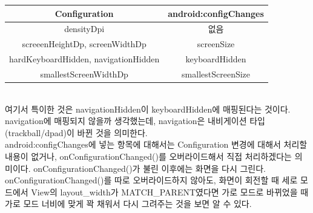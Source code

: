 \begin{tabular}{|c|c|}\hline
Configuration & android:configChanges \\ \hline
densityDpi & 없음 \\ \hline
screeenHeightDp, screenWidthDp & screenSize \\ \hline
hardKeyboardHidden, navigationHidden  & keyboardHidden  \\ \hline
smallestScreenWidthDp & smallestScreenSize \\ \hline
\end{tabular}\\

여기서 특이한 것은 navigationHidden이 keyboardHidden에 매핑된다는 것이다. navigation에 매핑되지 않을까 생각했는데, navigation은 내비게이션 타입(trackball/dpad)이 바뀐 것을 의미한다.\\

android:configChanges에 넣는 항목에 대해서는 Configuration 변경에 대해서 처리할 내용이 없거나, onConfigurationChanged()를 오버라이드해서 직접 처리하겠다는 의미이다. onConfigurationChanged()가 불린 이후에는 화면을 다시 그린다. onConfigurationChanged()를 따로 오버라이드하지 않아도, 화면이 회전할 때 세로 모드에서 View의 layout\_width가 MATCH\_PARENT였다면 가로 모드로 바뀌었을 때 가로 모드 너비에 맞게 꽉 채워서 다시 그려주는 것을 보면 알 수 있다.\\

